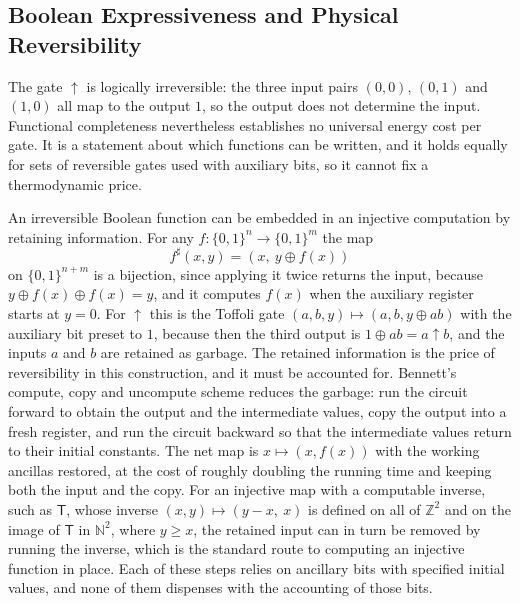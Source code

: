\documentclass[11pt]{article}
\theoremstyle{definition}
\theoremstyle{remark}
\newcommand{\nand}{\uparrow}
\newcommand{\Tm}{\mathsf{T}}
\begin{document}
\subsection{Boolean Expressiveness and Physical Reversibility}

The gate $\nand$ is logically irreversible: the three input pairs $(0,0)$, $(0,1)$ and $(1,0)$ all map to the output $1$, so the output does not determine the input. Functional completeness nevertheless establishes no universal energy cost per gate. It is a statement about which functions can be written, and it holds equally for sets of reversible gates used with auxiliary bits, so it cannot fix a thermodynamic price.

An irreversible Boolean function can be embedded in an injective computation by retaining information. For any $f : \{0,1\}^{n} \to \{0,1\}^{m}$ the map
\[
f^{\sharp}(x, y) = (x,\ y \oplus f(x))
\]
on $\{0,1\}^{n+m}$ is a bijection, since applying it twice returns the input, because $y \oplus f(x) \oplus f(x) = y$, and it computes $f(x)$ when the auxiliary register starts at $y = 0$. For $\nand$ this is the Toffoli gate $(a, b, y) \mapsto (a, b, y \oplus ab)$ with the auxiliary bit preset to $1$, because then the third output is $1 \oplus ab = a \nand b$, and the inputs $a$ and $b$ are retained as garbage. The retained information is the price of reversibility in this construction, and it must be accounted for. Bennett's compute, copy and uncompute scheme \cite{bennett1973} reduces the garbage: run the circuit forward to obtain the output and the intermediate values, copy the output into a fresh register, and run the circuit backward so that the intermediate values return to their initial constants. The net map is $x \mapsto (x, f(x))$ with the working ancillas restored, at the cost of roughly doubling the running time and keeping both the input and the copy. For an injective map with a computable inverse, such as $\Tm$, whose inverse $(x,y) \mapsto (y - x,\ x)$ is defined on all of $\mathbb{Z}^{2}$ and on the image of $\Tm$ in $\mathbb{N}^{2}$, where $y \ge x$, the retained input can in turn be removed by running the inverse, which is the standard route to computing an injective function in place. Each of these steps relies on ancillary bits with specified initial values, and none of them dispenses with the accounting of those bits.
\end{document}
